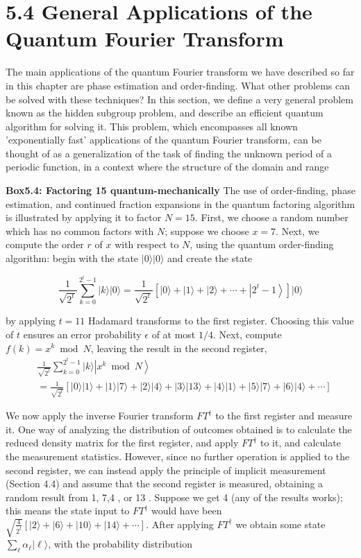 
\section{5.4 General Applications of the Quantum Fourier Transform}

The main applications of the quantum Fourier transform we have described so far in this chapter are phase estimation and order-finding. What other problems can be solved with these techniques? In this section, we define a very general problem known as the hidden subgroup problem, and describe an efficient quantum algorithm for solving it. This problem, which encompasses all known 'exponentially fast' applications of the quantum Fourier transform, can be thought of as a generalization of the task of finding the unknown period of a periodic function, in a context where the structure of the domain and range

\textbf{Box5.4: Factoring 15 quantum-mechanically}
The use of order-finding, phase estimation, and continued fraction expansions in the quantum factoring algorithm is illustrated by applying it to factor $N=15$. First, we choose a random number which has no common factors with $N$; suppose we choose $x=7$. Next, we compute the order $r$ of $x$ with respect to $N$, using the quantum order-finding algorithm: begin with the state $|0\rangle|0\rangle$ and create the state

\begin{equation}
    \frac{1}{\sqrt{2^{t}}} \sum_{k=0}^{2^{t}-1}|k\rangle|0\rangle=\frac{1}{\sqrt{2^{t}}}\left[|0\rangle+|1\rangle+|2\rangle+\cdots+\left|2^{t}-1\right\rangle\right]|0\rangle \tag{5.61}
\end{equation}

by applying $t=11$ Hadamard transforms to the first register. Choosing this value of $t$ ensures an error probability $\epsilon$ of at most $1 / 4$. Next, compute $f(k)=x^{k} \bmod N$, leaving the result in the second register,
\begin{align}
& \frac{1}{\sqrt{2^{t}}} \sum_{k=0}^{2^{t}-1}|k\rangle\left|x^{k} \bmod N\right\rangle  \tag{5.62}\\
& =\frac{1}{\sqrt{2^{t}}}[|0\rangle|1\rangle+|1\rangle|7\rangle+|2\rangle|4\rangle+|3\rangle|13\rangle+|4\rangle|1\rangle+|5\rangle|7\rangle+|6\rangle|4\rangle+\cdots]
\end{align}

We now apply the inverse Fourier transform $F T^{\dagger}$ to the first register and measure it. One way of analyzing the distribution of outcomes obtained is to calculate the reduced density matrix for the first register, and apply $F T^{\dagger}$ to it, and calculate the measurement statistics. However, since no further operation is applied to the second register, we can instead apply the principle of implicit measurement (Section 4.4) and assume that the second register is measured, obtaining a random result from 1, 7,4 , or 13 . Suppose we get 4 (any of the results works); this means the state input to $F T^{\dagger}$ would have been $\sqrt{\frac{4}{2^{t}}}[|2\rangle+|6\rangle+|10\rangle+|14\rangle+\cdots]$. After applying $F T^{\dagger}$ we obtain some state $\sum_{\ell} \alpha_{\ell}|\ell\rangle$, with the probability distribution

